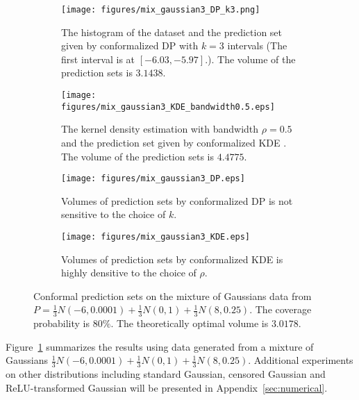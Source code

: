 \begin{figure}[htbp]
    \centering
    \begin{subfigure}[b]{0.48\columnwidth}
        \texttt{[image: figures/mix\_gaussian3\_DP\_k3.png]}
        \caption{The histogram of the dataset and the prediction set given by conformalized DP with $k=3$ intervals (The first interval is at $[-6.03,-5.97]$.). The volume of the prediction sets is $3.1438$.}
    \end{subfigure}
    \hfill
    \begin{subfigure}[b]{0.48\columnwidth}
        \texttt{[image: figures/mix\_gaussian3\_KDE\_bandwidth0.5.eps]}
        \caption{The kernel density estimation with bandwidth $\rho=0.5$ and the prediction set given by conformalized KDE \citep{Lei2013DistributionFreePS}. The volume of the prediction sets is $4.4775$.}
    \end{subfigure}
    \hfill
    \begin{subfigure}[b]{0.48\columnwidth}
        \texttt{[image: figures/mix\_gaussian3\_DP.eps]}
        \caption{Volumes of prediction sets by conformalized DP is not sensitive to the choice of $k$.}
    \end{subfigure}
    \hfill
    \begin{subfigure}[b]{0.48\columnwidth}
        \texttt{[image: figures/mix\_gaussian3\_KDE.eps]}
        \caption{Volumes of prediction sets by conformalized KDE is highly densitive to the choice of $\rho$.}
    \end{subfigure}        
    \caption{Conformal prediction sets on the mixture of Gaussians data from $P = \frac{1}{3}N(-6,0.0001)+\frac{1}{3}N(0,1)+\frac{1}{3}N(8,0.25)$. The coverage probability is $80\%$.
    The theoretically optimal volume is $3.0178$.}
    \label{fig:intro:unlabeled}
\end{figure}
Figure~\ref{fig:intro:unlabeled} summarizes the results using data generated from a mixture of Gaussians $\frac{1}{3}N(-6,0.0001)+\frac{1}{3}N(0,1)+\frac{1}{3}N(8,0.25)$. Additional experiments on other distributions including standard Gaussian, censored Gaussian and ReLU-transformed Gaussian will be presented in Appendix~\ref{sec:numerical}.


